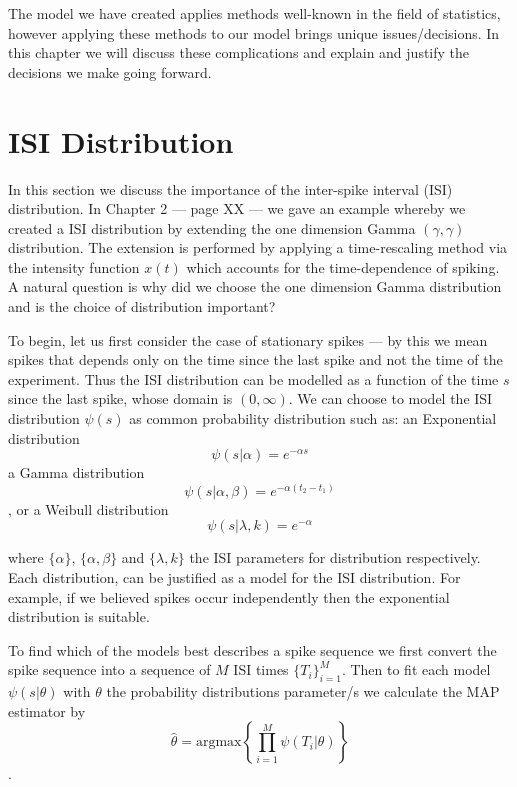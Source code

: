 \documentclass[../main.tex]{subfiles}
\begin{document}
The model we have created applies methods well-known in the field of statistics, however applying these methods to our model brings unique issues/decisions. In this chapter we will discuss these complications and explain and justify the decisions we make going forward. 

\section{ISI Distribution}

In this section we discuss the importance of the inter-spike interval (ISI) distribution. In Chapter 2 --- page { \color{red} XX} --- we gave an example whereby we created a ISI distribution by extending the one dimension Gamma $(\gamma, \gamma)$ distribution. The extension is performed by applying a time-rescaling method via the intensity function $x(t)$ which accounts for the time-dependence of  spiking. A natural question is why did we choose the one dimension Gamma distribution and is the choice of distribution important? 

To begin, let us first consider the case of stationary  spikes --- by this we mean spikes that depends only on the time since the last spike and not the time of the experiment. Thus the ISI distribution can be modelled as a function of the time $s$ since the last spike, whose domain is $(0,\infty)$. We can choose to model the ISI distribution $\psi (s)$ as common probability distribution such as: an Exponential distribution 
$$ \psi (s | \alpha ) = e^{-\alpha s}$$
  a Gamma distribution
   $$ \psi(s| \alpha, \beta ) = e^{-\alpha(t_2-t_1)}$$,
 or a Weibull distribution
   $$ \psi(s | \lambda, k ) = e^{-\alpha}$$
   
 where $\{ \alpha\}$, $\{\alpha, \beta\}$ and $\{\lambda , k\}$ the ISI parameters for distribution respectively. Each distribution, can be justified as a model for the ISI distribution. For example, if we believed spikes occur independently then the exponential distribution is suitable. 

To find which of the models best describes a  spike sequence we first convert the spike sequence into a sequence of $M$ ISI times $\{T_i\}_{i=1}^M$. Then to fit each model $\psi(s|\theta)$ with $\theta$ the probability distributions parameter/s we calculate the MAP estimator by 
$$\hat \theta  = \mathrm{arg max} \left\{ \prod ^M_{i=1} \psi(T_i | \theta ) \right\}$$.
\end{document}
